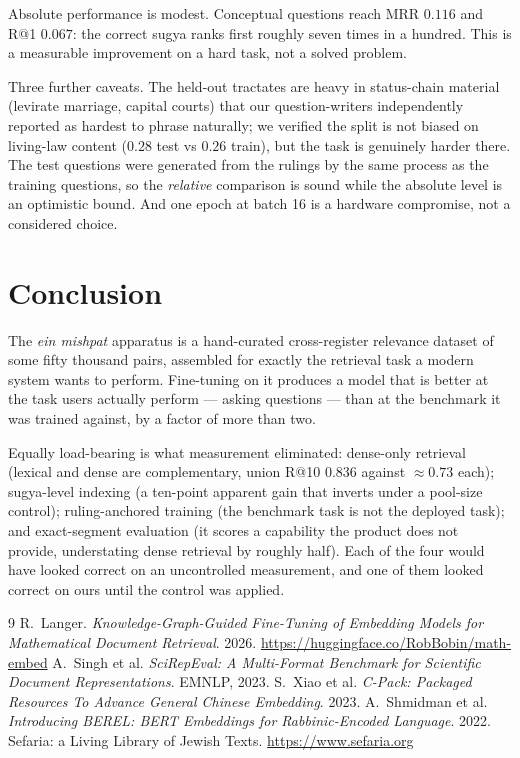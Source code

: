 \documentclass[11pt,a4paper]{article}
\begin{document}
Absolute performance is modest. Conceptual questions reach MRR $0.116$ and R@1
$0.067$: the correct sugya ranks first roughly seven times in a hundred. This is
a measurable improvement on a hard task, not a solved problem.

Three further caveats. The held-out tractates are heavy in status-chain material
(levirate marriage, capital courts) that our question-writers independently
reported as hardest to phrase naturally; we verified the split is not biased on
living-law content ($0.28$ test vs $0.26$ train), but the task is genuinely
harder there. The test questions were generated from the rulings by the same
process as the training questions, so the \emph{relative} comparison is sound
while the absolute level is an optimistic bound. And one epoch at batch 16 is a
hardware compromise, not a considered choice.

\section{Conclusion}

The \emph{ein mishpat} apparatus is a hand-curated cross-register relevance
dataset of some fifty thousand pairs, assembled for exactly the retrieval task a
modern system wants to perform. Fine-tuning on it produces a model that is
better at the task users actually perform --- asking questions --- than at the
benchmark it was trained against, by a factor of more than two.

Equally load-bearing is what measurement eliminated: dense-only retrieval
(lexical and dense are complementary, union R@10 $0.836$ against $\approx 0.73$
each); sugya-level indexing (a ten-point apparent gain that inverts under a
pool-size control); ruling-anchored training (the benchmark task is not the
deployed task); and exact-segment evaluation (it scores a capability the product
does not provide, understating dense retrieval by roughly half). Each of the
four would have looked correct on an uncontrolled measurement, and one of them
looked correct on ours until the control was applied.

\begin{thebibliography}{9}
 R.~Langer. \emph{Knowledge-Graph-Guided Fine-Tuning of
Embedding Models for Mathematical Document Retrieval}. 2026.
\url{https://huggingface.co/RobBobin/math-embed}
 A.~Singh et al. \emph{SciRepEval: A Multi-Format Benchmark
for Scientific Document Representations}. EMNLP, 2023.
 S.~Xiao et al. \emph{C-Pack: Packaged Resources To Advance General
Chinese Embedding}. 2023.
 A.~Shmidman et al. \emph{Introducing BEREL: BERT Embeddings for
Rabbinic-Encoded Language}. 2022.
 Sefaria: a Living Library of Jewish Texts.
\url{https://www.sefaria.org}
\end{thebibliography}
\end{document}
